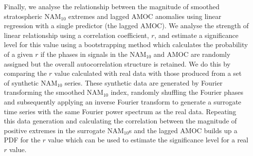 Finally, we analyse the relationship between the magnitude of smoothed stratospheric NAM$_{10}$ extremes and lagged AMOC anomalies using linear regression with a single predictor (the lagged AMOC). We analyse the strength of linear relationship using a correlation coefficient, $r$, and estimate a significance level for this value using a bootstrapping method which calculates the probability of a given $r$ if the phases in signals in the NAM$_{10}$ and AMOC are randomly assigned but the overall autocorrelation structure is retained. We do this by comparing the $r$ value calculated with real data with those produced from a set of synthetic NAM$_{10}$ series. These synthetic data are generated by Fourier transforming the smoothed NAM$_{10}$ index, randomly shuffling the Fourier phases and subsequently applying an inverse Fourier transform to generate a surrogate time series with the same Fourier power spectrum as the real data. Repeating this data generation and calculating the correlation between the magnitude of positive extremes in the surrogate NAM$_{10}$s and the lagged AMOC builds up a PDF for the $r$ value which can be used to estimate the significance level for a real $r$ value.

